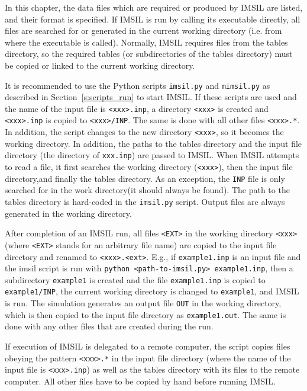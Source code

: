 In this chapter, the data files which are required or produced by IMSIL are
listed, and their format is specified. If IMSIL is run by calling its executable
directly, all files are searched for or generated in the current working
directory (i.e. from where the executable is called). Normally, IMSIL requires
files from the tables directory, so the required tables (or subdirectories
of the tables directory) must be copied or linked to the current working
directory.

It is recommended to use the Python scripts \texttt{imsil.py} and
\texttt{mimsil.py} as described in Section~\ref{s:scripts_run} to start IMSIL.
If these scripts are used and the name of the input file is \texttt{<xxx>.inp},
a directory \texttt{<xxx>} is created and \texttt{<xxx>.inp} is copied to
\texttt{<xxx>/INP}. The same is done with all other files \texttt{<xxx>.*}. In
addition, the script changes to the new directory \texttt{<xxx>}, so it
becomes the working directory. In addition, the paths to the tables directory
and the input file directory (the directory of \texttt{xxx.inp}) are passed to
IMSIL. When IMSIL attempts to read a file, it first searches the working
directory (\texttt{<xxx>}), then the input file directory,and finally the
tables directory. As an exception, the \texttt{INP} file is only searched for
in the work directory(it should always be found). The path to the tables
directory is hard-coded in the \texttt{imsil.py} script. Output files are
always generated in the working directory.

After completion of an IMSIL run, all files \texttt{<EXT>} in the working
directory \texttt{<xxx>} (where \texttt{<EXT>} stands for an arbitrary file
name) are copied to the input file directory and renamed to
\texttt{<xxx>.<ext>}. E.g., if \texttt{example1.inp} is an input file and the
imsil script is run with \texttt{python <path-to-imsil.py> example1.inp}, then
a subdirectory \texttt{example1} is created and the file \texttt{example1.inp}
is copied to \texttt{example1/INP}, the current working directory is changed to
\texttt{example1}, and IMSIL is run. The simulation generates an output file
\texttt{OUT} in the working directory, which is then copied to the input file
directory as \texttt{example1.out}. The same is done with any other files that
are created during the run.

If execution of IMSIL is delegated to a remote computer, the script copies files
obeying the pattern \texttt{<xxx>.*} in the input file directory (where the name
of the input file is \texttt{<xxx>.inp}) as well as the tables directory with
its files to the remote computer. All other files have to be copied by hand
before running IMSIL.
